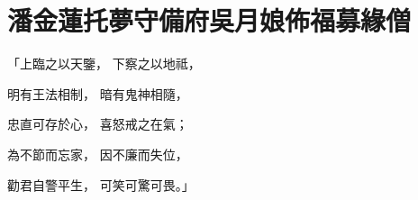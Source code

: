 %

\chapter{潘金蓮托夢守備府\KG 吳月娘佈福募緣僧}


\begin{showcontents}{}



「上臨之以天鑒，  下察之以地祗，

明有王法相制，  暗有鬼神相隨，

忠直可存於心，  喜怒戒之在氣；

為不節而忘家，  因不廉而失位，

勸君自警平生，  可笑可驚可畏。」


\end{showcontents}
